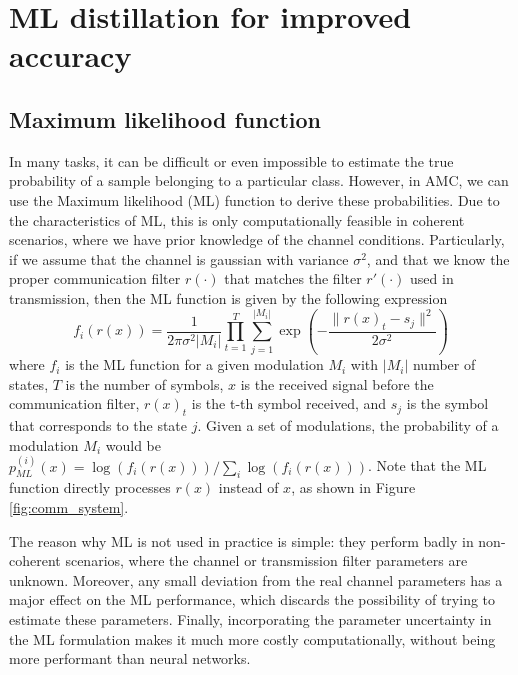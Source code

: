 \documentclass[conference]{IEEEtran}
\newcommand{\pf}[1]{{\textcolor{orange}{PF: {#1}}}}
\begin{document}
\section{ML distillation for improved accuracy}


\subsection{Maximum likelihood function}

In many tasks, it can be difficult or even impossible to estimate the true probability of a sample belonging to a particular class. However, in AMC, we can use the Maximum likelihood (ML) function to derive these probabilities. Due to the characteristics of ML, this is only computationally feasible in coherent scenarios, where we have prior knowledge of the channel conditions. Particularly, if we assume that the channel is gaussian with variance $\sigma^{2}$, and that we know the proper communication filter $r(\cdot)$ that matches the filter $r'(\cdot)$ used in transmission, then the ML function is given by the following expression
\begin{equation}
	f_{i}(r(x)) = \dfrac{1}{2\pi \sigma^{2}|M_i|}\prod_{t=1}^{T} \sum_{j=1}^{|M_i|} \exp\left(-\dfrac{\lVert r(x)_t - s_j\rVert^{2}}{2 \sigma^{2}}\right)
\label{eq:ml}
\end{equation}
where $f_{i}$ is the ML function for a given modulation $M_i$ with $|M_i|$ number of states, $T$ is the number of symbols, $x$ is the received signal before the communication filter, $r(x)_t$ is the t-th symbol received, and $s_j$ is the symbol that corresponds to the state $j$. Given a set of modulations, the probability of a modulation $M_i$ would be $p_{ML}^{(i)}(x) = \log(f_{i}(r(x))) / \sum_i \log(f_{i}(r(x)))$. Note that the ML function directly processes $r(x)$ instead of $x$, as shown in Figure \ref{fig:comm_system}.

The reason why ML is not used in practice is simple: they perform badly in non-coherent scenarios, where the channel or transmission filter parameters are unknown. Moreover, any small deviation from the real channel parameters has a major effect on the ML performance, which discards the possibility of trying to estimate these parameters. Finally, incorporating the parameter uncertainty in the ML formulation makes it much more costly computationally, without being more performant than neural networks.
\end{document}
